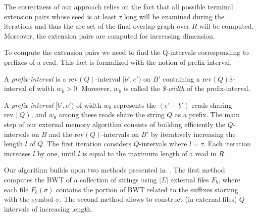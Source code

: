 \documentclass[runningheads,envcountsame,a4paper]{llncs}
\newcommand{\notaestesa}[2]{%
 \marginpar{\color{red!75!black}\textbf{\texttimes}}%
 {\color{red!75!black}%
 [\,\textbullet\,\textsf{\textbf{#1:}} %
 \textsf{\footnotesize#2}\,\textbullet\,]}%
}
\newcommand{\rev}{\ensuremath{\mathrm{rev}}}
\begin{document}
The correctness of our approach relies on the fact that all possible
terminal extension pairs whose seed is at least $\tau$ long will be examined during the iterations and thus
the arc set of the final overlap  graph over $R$ will be computed.
Moreover, the extension pairs are computed for increasing dimension.






To compute the extension pairs we need to find the Q-intervals  corresponding to prefixes of a read.
This fact is formalized with the notion of prefix-interval.

\begin{definition}
A \emph{prefix-interval} is a $\rev(Q)$-interval $[b',e')$ on $B'$ containing
a $\rev(Q)\$$-interval of width $w_{\$}>0$.
Moreover, $w_{\$}$ is called the \emph{\$-width}
of the prefix-interval.
\end{definition}

A \emph{prefix-interval} $[b',e')$ of width $w_{\$}$ represents the $(e'-b')$
reads sharing $\rev(Q)$, and $w_{\$}$ among these reads share the string $Q$ as a
prefix.
%
The main step of our external memory algorithm consists of  building efficiently
the $Q$-intervals on $B$ and the $\rev(Q)$-intervals on
$B'$ by iteratively increasing the length $l$ of $Q$.
The first iteration considers $Q$-intervals where $l=\tau$.
Each iteration increases $l$ by one, until $l$ is equal to the maximum length
of a read in $R$.


Our algorithm builds upon two methods presented in~\cite{Bauer2011,Cox2012}.
The first method computes the BWT of a collection of strings using $|\Sigma|$
external files $F_b$, where each file $F_b(\sigma)$ contains the portion of BWT related to the suffixes
starting with the symbol $\sigma$.
The second method allows to construct (in external files) $Q$-intervals
of increasing length.%

\begin{comment}
In particular, the procedure \emph{processInterval} given
in~\cite{Cox2012} is used in our algorithm to produce the sorted list
(lexicographical order) of the intervals of a given length $l$, from the
sorted list of the intervals of length $l-1$ (intervals of length $1$
can be easily obtained by means of the FM-index function $C$).
\notaestesa{Raffa}{Togliere lo pseudocodice della procedura processInterval: \'e della Rosone e non nostro.}.
\notaestesa{GDV}{ Concordo di togliere lo pseudocodice.
Bisogna dire però cosa calcola la procedura}

We extend the procedure \emph{processInterval} to
\emph{extendLinkedInterval}, where we produce not only the $Q$-intervals on $B$, but also the linked
$\rev(Q)$-intervals on $B'$.
\end{comment}
\end{document}
